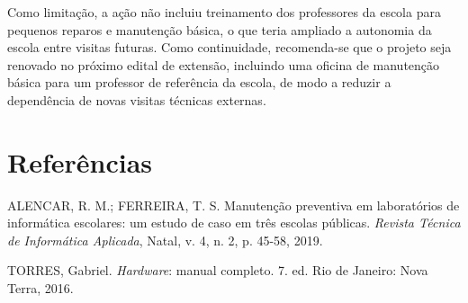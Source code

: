 \documentclass[article,12pt,a4paper]{abntex2}
\begin{document}
Como limitação, a ação não incluiu treinamento dos professores da escola
para pequenos reparos e manutenção básica, o que teria ampliado a
autonomia da escola entre visitas futuras. Como continuidade, recomenda-se
que o projeto seja renovado no próximo edital de extensão, incluindo uma
oficina de manutenção básica para um professor de referência da escola,
de modo a reduzir a dependência de novas visitas técnicas externas.

\postextual

\section*{Referências}

\newcommand{\referencia}[1]{\par\noindent\hangindent=1cm #1\par\medskip}

\referencia{ALENCAR, R. M.; FERREIRA, T. S. Manutenção preventiva em
laboratórios de informática escolares: um estudo de caso em três escolas
públicas. \textit{Revista Técnica de Informática Aplicada}, Natal, v. 4,
n. 2, p. 45-58, 2019.}

\referencia{TORRES, Gabriel. \textit{Hardware}: manual completo. 7. ed. Rio
de Janeiro: Nova Terra, 2016.}
\end{document}

